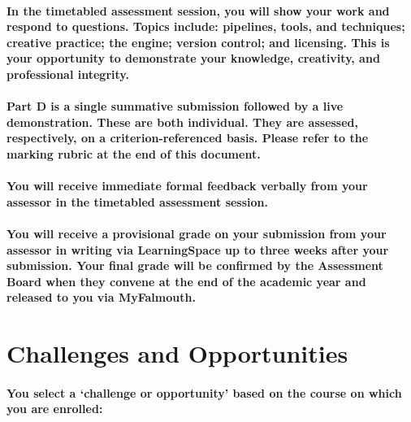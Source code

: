 \documentclass{../../fal_assignment}
\begin{document}
\paragraph{In the timetabled assessment session, you will show your work and respond to questions. Topics include: pipelines, tools, and techniques; creative practice; the engine; version control; and licensing. This is your opportunity to demonstrate your knowledge, creativity, and professional integrity.}


\paragraph{Part D is a \textbf{single summative submission} followed by a \textbf{live demonstration}. These are both \textbf{individual}. They are assessed, respectively, on a \textbf{criterion-referenced} basis. Please refer to the marking rubric at the end of this document.}


\paragraph{You will receive immediate \textbf{formal feedback} verbally from your \textbf{assessor} in the timetabled assessment session.}

\paragraph{You will receive a \textbf{provisional grade} on your submission from your \textbf{assessor} in writing via LearningSpace up to three weeks after your submission. Your \textbf{final grade} will be confirmed by the Assessment Board when they convene at the end of the academic year and released to you via MyFalmouth.}


\section*{Challenges and Opportunities}

\paragraph{You select a `challenge or opportunity' based on the course on which you are enrolled:}
\end{document}
